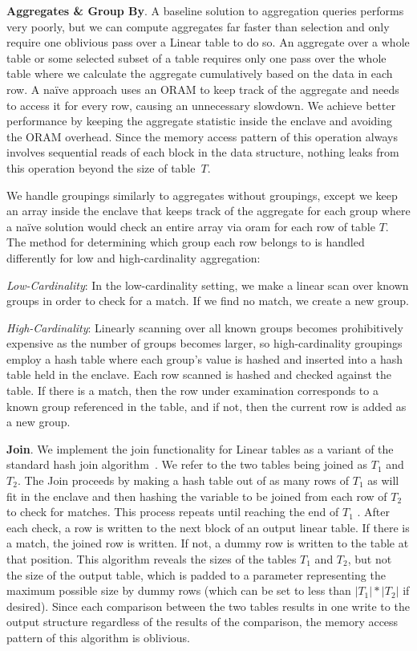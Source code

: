 \documentclass[letterpaper,twocolumn,10pt]{article}
\begin{document}
  \noindent \textbf{Aggregates \& Group By}.
A baseline solution to aggregation queries performs very poorly, but we can compute aggregates far faster than selection and only require one oblivious pass over a Linear table to do so.  An aggregate over a whole table or some selected subset of a table requires only one pass over the whole table where we calculate the aggregate cumulatively based on the data in each row. A na\"ive approach uses an ORAM to keep track of the aggregate and needs to access it for every row, causing an unnecessary slowdown. We achieve better performance by keeping the aggregate statistic inside the enclave and avoiding the ORAM overhead. Since the memory access pattern of this operation always involves sequential reads of each block in the data structure, nothing leaks from this operation beyond the size of table~$T$.

We handle groupings similarly to aggregates without groupings, except we keep an array inside the enclave that keeps track of the aggregate for each group where a na\"ive solution would check an entire array via oram for each row of table $T$. The method for determining which group each row belongs to is handled differently for low and high-cardinality aggregation:

\textit{Low-Cardinality}: In the low-cardinality setting, we make a linear scan over known groups in order to check for a match. If we find no match, we create a new group.

\textit{High-Cardinality}: Linearly scanning over all known groups becomes prohibitively expensive as the number of groups becomes larger, so high-cardinality groupings employ a hash table where each group's value is hashed and inserted into a hash table held in the enclave. Each row scanned is hashed and checked against the table. If there is a match, then the row under examination corresponds to a known group referenced in the table, and if not, then the current row is added as a new group.


  \noindent \textbf{Join}.
We implement the join functionality for Linear tables as a variant of the standard hash join algorithm~\cite{EN10}. We refer to the two tables being joined as $T_1$ and $T_2$. The Join proceeds by making a hash table out of as many rows of $T_1$ as will fit in the enclave and then hashing the variable to be joined from each row of $T_2$ to check for matches. This process repeats until reaching the end of $T_1$ . After each check, a row is written to the next block of an output linear table. If there is a match, the joined row is written. If not, a dummy row is written to the table at that position. This algorithm reveals the sizes of the tables $T_1$ and $T_2$, but not the size of the output table, which is padded to a parameter representing the maximum possible size by dummy rows (which can be set to less than $|T_1|*|T_2|$ if desired). Since each comparison between the two tables results in one write to the output structure regardless of the results of the comparison, the memory access pattern of this algorithm is oblivious.
\end{document}
